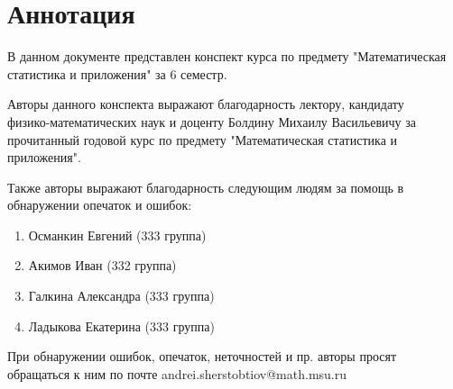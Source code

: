 \section*{Аннотация}

В данном документе представлен конспект курса по
предмету "Математическая статистика и приложения"
за 6 семестр.

Авторы данного конспекта выражают благодарность лектору, кандидату \\ физико-математических наук и доценту
Болдину Михаилу Васильевичу за прочитанный годовой курс по предмету
"Математическая статистика и приложения".

Также авторы выражают благодарность следующим людям за помощь
в обнаружении опечаток и ошибок:
\begin{enumerate}
    \item Османкин Евгений (333 группа)
    \item Акимов Иван (332 группа)
    \item Галкина Александра (333 группа)
    \item Ладыкова Екатерина (333 группа)
\end{enumerate}

При обнаружении ошибок, опечаток, неточностей и пр. авторы просят
обращаться к ним по почте andrei.sherstobtiov@math.msu.ru